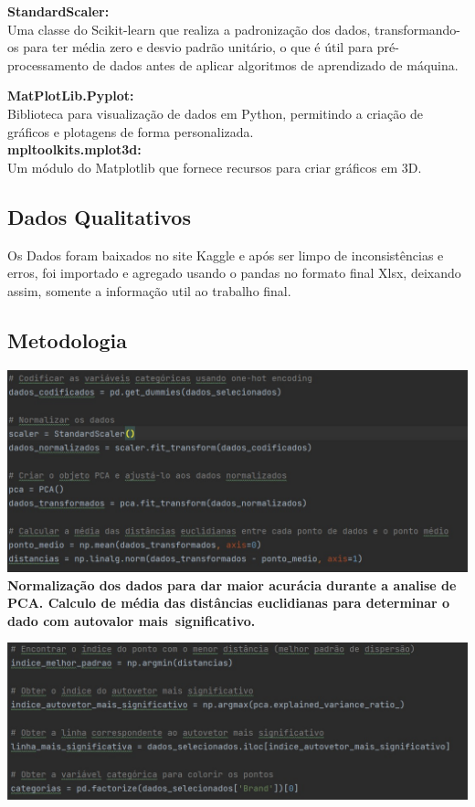 \documentclass[12pt, a4paper]{article}
\begin{document}
\begin{enumerate}
\textbf{StandardScaler:}\\
Uma classe do Scikit-learn que realiza a padronização dos dados, transformando-os para ter média zero e desvio padrão unitário, o que é útil para pré-processamento de dados antes de aplicar algoritmos de aprendizado de máquina.

\textbf{MatPlotLib.Pyplot:}\\
Biblioteca para visualização de dados em Python, permitindo a criação de gráficos e plotagens de forma personalizada.\\
\textbf{mpltoolkits.mplot3d:}\\Um módulo do Matplotlib que fornece recursos para criar gráficos em 3D.\\


\subsection{Dados Qualitativos}
Os Dados foram baixados no site Kaggle e após ser limpo de inconsistências e erros, foi importado e agregado usando o pandas no formato final Xlsx, deixando assim, somente a informação util ao trabalho final.


\subsection{Metodologia}

\begin{center}
    \includegraphics[width=14cm]{figura2}
 \textbf{Normalização dos dados para dar maior acurácia durante a analise de PCA. Calculo de média das distâncias euclidianas para determinar o dado com autovalor mais significativo.}  
\end{center}

\begin{center}
    \includegraphics[width=14cm]{figura 3.jpg}
\end{center} 


\end{enumerate}
\end{document}
